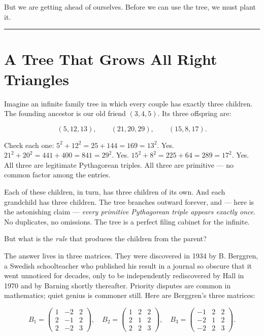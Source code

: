 \documentclass[11pt,openany]{book}
\theoremstyle{definition}
\theoremstyle{plain}
\theoremstyle{remark}
\begin{document}
But we are getting ahead of ourselves. Before we can use the tree, we must plant it.

\bigskip\noindent\rule{\textwidth}{0.4pt}\bigskip


\section*{A Tree That Grows All Right Triangles}


Imagine an infinite family tree in which every couple has exactly three children. The founding ancestor is our old friend $(3, 4, 5)$. Its three offspring are:

$$(5, 12, 13), \qquad (21, 20, 29), \qquad (15, 8, 17).$$

Check each one: $5^2 + 12^2 = 25 + 144 = 169 = 13^2$. Yes. $21^2 + 20^2 = 441 + 400 = 841 = 29^2$. Yes. $15^2 + 8^2 = 225 + 64 = 289 = 17^2$. Yes. All three are legitimate Pythagorean triples. All three are primitive — no common factor among the entries.

Each of these children, in turn, has three children of its own. And each grandchild has three children. The tree branches outward forever, and — here is the astonishing claim — \textit{every primitive Pythagorean triple appears exactly once}. No duplicates, no omissions. The tree is a perfect filing cabinet for the infinite.

But what is the \textit{rule} that produces the children from the parent?

The answer lives in three matrices. They were discovered in 1934 by B. Berggren, a Swedish schoolteacher who published his result in a journal so obscure that it went unnoticed for decades, only to be independently rediscovered by Hall in 1970 and by Barning shortly thereafter. Priority disputes are common in mathematics; quiet genius is commoner still. Here are Berggren's three matrices:

$$B_1 = \begin{pmatrix} 1 & -2 & 2 \\ 2 & -1 & 2 \\ 2 & -2 & 3 \end{pmatrix}, \quad B_2 = \begin{pmatrix} 1 & 2 & 2 \\ 2 & 1 & 2 \\ 2 & 2 & 3 \end{pmatrix}, \quad B_3 = \begin{pmatrix} -1 & 2 & 2 \\ -2 & 1 & 2 \\ -2 & 2 & 3 \end{pmatrix}.$$
\end{document}
